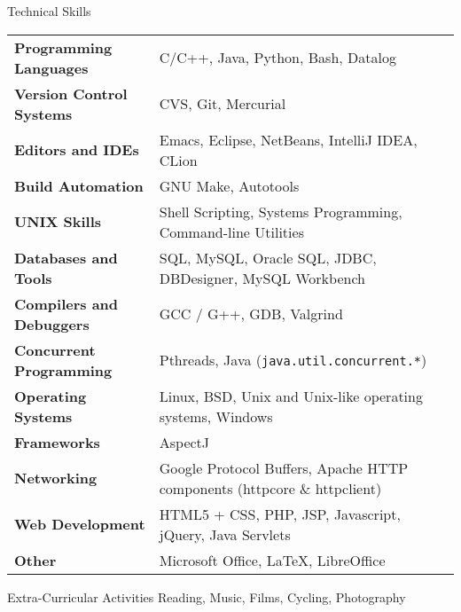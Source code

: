 \documentclass{resume}
\begin{document}
\begin{rSection}{Technical Skills}

{\renewcommand{\arraystretch}{1.3}
\begin{tabular}{ @{} >{\bfseries}l @{\hspace{6ex}} l }

Programming Languages
   & C/C++, Java, Python, Bash,  Datalog \\

Version Control Systems
   & CVS, Git, Mercurial \\

Editors and IDEs
   & Emacs, Eclipse, NetBeans, IntelliJ IDEA, CLion \\

Build Automation
   & GNU Make, Autotools \\

UNIX Skills
   & Shell Scripting, Systems Programming, Command-line Utilities \\

Databases and Tools
   & SQL, MySQL, Oracle SQL, JDBC, DBDesigner, MySQL Workbench \\

Compilers and Debuggers
   & GCC / G++, GDB, Valgrind \\

Concurrent Programming
   & Pthreads, Java (\texttt{java.util.concurrent.*}) \\

Operating Systems
   & Linux, BSD, Unix and Unix-like operating systems, Windows \\

Frameworks
   & AspectJ \\

Networking
   & Google Protocol Buffers, Apache HTTP components (httpcore \& httpclient) \\

Web Development
   & HTML5 + CSS, PHP, JSP, Javascript, jQuery, Java Servlets \\

Other
   & Microsoft Office, \LaTeX{}, LibreOffice \\
\end{tabular}}
\end{rSection}


\begin{rSection}{Extra-Curricular Activities}
  Reading, Music, Films, Cycling, Photography \\
\end{rSection}
\end{document}
